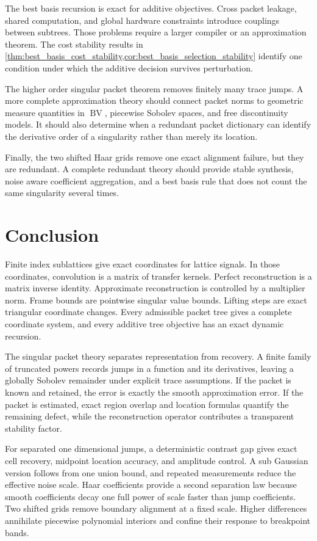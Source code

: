 \documentclass{aomart}
\theoremstyle{definition}
\theoremstyle{remark}
\newcommand{\BV}{\operatorname{BV}}
\begin{document}
The best basis recursion is exact for additive objectives. Cross packet leakage, shared computation, and global hardware constraints introduce couplings between subtrees. Those problems require a larger compiler or an approximation theorem. The cost stability results in \cref{thm:best_basis_cost_stability,cor:best_basis_selection_stability} identify one condition under which the additive decision survives perturbation.

The higher order singular packet theorem removes finitely many trace jumps. A more complete approximation theory should connect packet norms to geometric measure quantities in \(\BV\), piecewise Sobolev spaces, and free discontinuity models. It should also determine when a redundant packet dictionary can identify the derivative order of a singularity rather than merely its location.

Finally, the two shifted Haar grids remove one exact alignment failure, but they are redundant. A complete redundant theory should provide stable synthesis, noise aware coefficient aggregation, and a best basis rule that does not count the same singularity several times.

\section{Conclusion}\label{sec:conclusion}

Finite index sublattices give exact coordinates for lattice signals. In those coordinates, convolution is a matrix of transfer kernels. Perfect reconstruction is a matrix inverse identity. Approximate reconstruction is controlled by a multiplier norm. Frame bounds are pointwise singular value bounds. Lifting steps are exact triangular coordinate changes. Every admissible packet tree gives a complete coordinate system, and every additive tree objective has an exact dynamic recursion.

The singular packet theory separates representation from recovery. A finite family of truncated powers records jumps in a function and its derivatives, leaving a globally Sobolev remainder under explicit trace assumptions. If the packet is known and retained, the error is exactly the smooth approximation error. If the packet is estimated, exact region overlap and location formulas quantify the remaining defect, while the reconstruction operator contributes a transparent stability factor.

For separated one dimensional jumps, a deterministic contrast gap gives exact cell recovery, midpoint location accuracy, and amplitude control. A sub Gaussian version follows from one union bound, and repeated measurements reduce the effective noise scale. Haar coefficients provide a second separation law because smooth coefficients decay one full power of scale faster than jump coefficients. Two shifted grids remove boundary alignment at a fixed scale. Higher differences annihilate piecewise polynomial interiors and confine their response to breakpoint bands.
\end{document}
